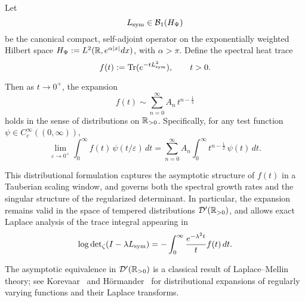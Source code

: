 \begin{lemma}
\label{lem:distributional_trace_asymptotics}
Let
\[
L_{\mathrm{sym}} \in \mathcal{B}_1(H_{\Psi})
\]
be the canonical compact, self-adjoint operator on the exponentially weighted Hilbert space \( H_{\Psi} := L^2(\mathbb{R}, e^{\alpha|x|} dx) \), with \( \alpha > \pi \). Define the spectral heat trace
\[
f(t) := \operatorname{Tr}(e^{-t L_{\mathrm{sym}}^2}), \qquad t > 0.
\]

Then as \( t \to 0^+ \), the expansion
\[
f(t) \sim \sum_{n=0}^\infty A_n \, t^{n - \frac{1}{2}}
\]
holds in the sense of distributions on \( \mathbb{R}_{>0} \). Specifically, for any test function \( \psi \in C_c^\infty((0, \infty)) \),
\[
\lim_{\varepsilon \to 0^+} \int_0^\infty f(t) \, \psi(t/\varepsilon) \, dt
= \sum_{n=0}^\infty A_n \int_0^\infty t^{n - \frac{1}{2}} \, \psi(t)\, dt.
\]

\medskip
\noindent
This distributional formulation captures the asymptotic structure of \( f(t) \) in a Tauberian scaling window, and governs both the spectral growth rates and the singular structure of the regularized determinant. In particular, the expansion remains valid in the space of tempered distributions \( \mathcal{D}'(\mathbb{R}_{>0}) \), and allows exact Laplace analysis of the trace integral appearing in
\[
\log \det\nolimits_{\zeta}(I - \lambda L_{\mathrm{sym}}) = - \int_0^\infty \frac{e^{-\lambda^2 t}}{t} f(t) \, dt.
\]

\medskip
\noindent
The asymptotic equivalence in \( \mathcal{D}'(\mathbb{R}_{>0}) \) is a classical result of Laplace–Mellin theory; see Korevaar~\cite[Ch.~IV]{Korevaar2004Tauberian} and Hörmander~\cite[Vol.~I, §7.1]{Hormander1983Analysis} for distributional expansions of regularly varying functions and their Laplace transforms.
\end{lemma}
